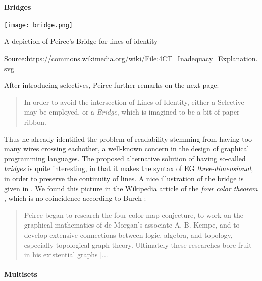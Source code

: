 \paragraph{Bridges} 

\begin{marginfigure}
  \texttt{[image: bridge.png]}
  \caption{A depiction of Peirce's Bridge for lines of identity}
  \footnotesize Source:\hspace{3pt}\url{https://commons.wikimedia.org/wiki/File:4CT_Inadequacy_Explanation.svg}
\end{marginfigure}

After introducing selectives, Peirce further remarks on the next page:
\begin{quote}
  In order to avoid the intersection of Lines of Identity, either a Selective
may be employed, or a \emph{Bridge}, which is imagined to be a bit of paper
ribbon.
\end{quote}
Thus he already identified the problem of readability stemming from having too
many wires crossing eachother, a well-known concern in the design of graphical
programming languages. The proposed
alternative solution of having so-called \emph{bridges} is quite interesting, in
that it makes the syntax of EG \emph{three-dimensional}, in order to preserve
the continuity of lines. A nice illustration of the bridge is given in
. We found this picture in the Wikipedia article of the
\emph{four color theorem} \cite{noauthor_four_2023}, which is no coincidence
according to Burch \cite{sep-peirce}:
\begin{quote}
  Peirce began to research the four-color map conjecture, to work on the
graphical mathematics of de Morgan's associate A. B. Kempe, and to develop
extensive connections between logic, algebra, and topology, especially
topological graph theory. Ultimately these researches bore fruit in his
existential graphs [...]
\end{quote}

\paragraph{Multisets}

